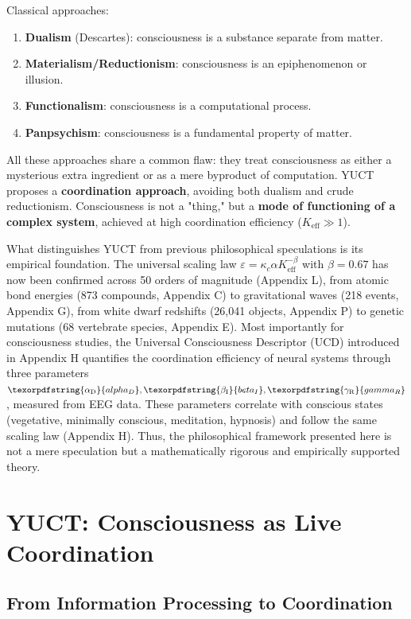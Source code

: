\documentclass[12pt,a4paper]{article}
\DeclareRobustCommand{\alD}{\texorpdfstring{\ensuremath{\alpha_{\mathrm{D}}}}{alpha_D}}
\DeclareRobustCommand{\beI}{\texorpdfstring{\ensuremath{\beta_{\mathrm{I}}}}{beta_I}}
\DeclareRobustCommand{\gaR}{\texorpdfstring{\ensuremath{\gamma_{\mathrm{R}}}}{gamma_R}}
\newcommand{\eff}{\mathrm{eff}}
\newcommand{\Ke}{K_{\eff}}
\begin{document}
	Classical approaches:
	\begin{enumerate}
		\item \textbf{Dualism} (Descartes): consciousness is a substance separate from matter.
		\item \textbf{Materialism/Reductionism}: consciousness is an epiphenomenon or illusion.
		\item \textbf{Functionalism}: consciousness is a computational process.
		\item \textbf{Panpsychism}: consciousness is a fundamental property of matter.
	\end{enumerate}
	
	All these approaches share a common flaw: they treat consciousness as either a mysterious extra ingredient or as a mere byproduct of computation. YUCT proposes a \textbf{coordination approach}, avoiding both dualism and crude reductionism. Consciousness is not a "thing," but a \textbf{mode of functioning of a complex system}, achieved at high coordination efficiency ($\Ke \gg 1$). 
	
	What distinguishes YUCT from previous philosophical speculations is its empirical foundation. The universal scaling law \(\varepsilon = \kappa_c \alpha \Ke^{-\beta}\) with \(\beta = 0.67\) has now been confirmed across 50 orders of magnitude (Appendix L), from atomic bond energies (873 compounds, Appendix C) to gravitational waves (218 events, Appendix G), from white dwarf redshifts (26,041 objects, Appendix P) to genetic mutations (68 vertebrate species, Appendix E). Most importantly for consciousness studies, the Universal Consciousness Descriptor (UCD) introduced in Appendix H quantifies the coordination efficiency of neural systems through three parameters \(\alD, \beI, \gaR\), measured from EEG data. These parameters correlate with conscious states (vegetative, minimally conscious, meditation, hypnosis) and follow the same scaling law (Appendix H). Thus, the philosophical framework presented here is not a mere speculation but a mathematically rigorous and empirically supported theory.
	
	\section{YUCT: Consciousness as Live Coordination}
	
	\subsection{From Information Processing to Coordination}
	
\end{document}
